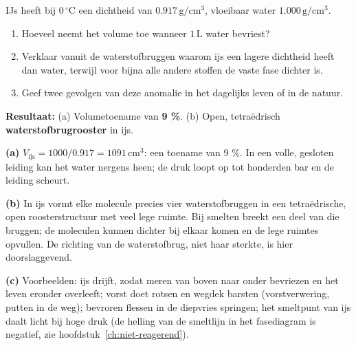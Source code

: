 \begin{oefening}
IJs heeft bij \(0\,^\circ\mathrm{C}\) een dichtheid van \(0.917\,\mathrm{g/cm^3}\), vloeibaar water \(1.000\,\mathrm{g/cm^3}\).

\begin{enumerate}
\item[(a)]
  Hoeveel neemt het volume toe wanneer \(1\,\mathrm{L}\) water bevriest?
\item[(b)]
  Verklaar vanuit de waterstofbruggen waarom ijs een lagere dichtheid heeft dan water, terwijl voor bijna alle andere stoffen de vaste fase dichter is.
\item[(c)]
  Geef twee gevolgen van deze anomalie in het dagelijks leven of in de natuur.
\end{enumerate}
\end{oefening}
\begin{oplossing}
\textbf{Resultaat:} (a) Volumetoename van \textbf{9 \%}. (b) Open, tetraëdrisch \textbf{waterstofbrugrooster} in ijs.

\textbf{(a)} \(V_{\text{ijs}} = 1000/0.917 = 1091\,\mathrm{cm^3}\): een toename van 9 \%. In een volle, gesloten leiding kan het water nergens heen; de druk loopt op tot honderden bar en de leiding scheurt.

\textbf{(b)} In ijs vormt elke molecule precies vier waterstofbruggen in een tetraëdrische, open roosterstructuur met veel lege ruimte. Bij smelten breekt een deel van die bruggen; de moleculen kunnen dichter bij elkaar komen en de lege ruimtes opvullen. De richting van de waterstofbrug, niet haar sterkte, is hier doorslaggevend.

\textbf{(c)} Voorbeelden: ijs drijft, zodat meren van boven naar onder bevriezen en het leven eronder overleeft; vorst doet rotsen en wegdek barsten (vorstverwering, putten in de weg); bevroren flessen in de diepvries springen; het smeltpunt van ijs daalt licht bij hoge druk (de helling van de smeltlijn in het fasediagram is negatief, zie hoofdstuk~\ref{ch:niet-reagerend}).
\end{oplossing}


